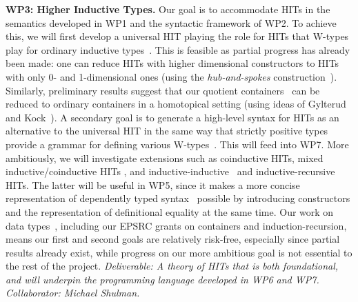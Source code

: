 \documentclass[a4paper,11pt]{article}
\begin{document}
{\bf WP3: Higher Inductive Types.} Our goal is to accommodate HITs in
the semantics developed in WP1 and the syntactic framework of WP2. To
achieve this, we will first develop a universal HIT playing the role for
HITs that W-types play for ordinary inductive
types~\cite{alti:icalp04}. This is feasible as partial progress has
already been made: one can reduce HITs with higher dimensional
constructors to HITs with only 0- and 1-dimensional ones (using the
\emph{hub-and-spokes} construction~\cite{hott-book}).
Similarly, preliminary results suggest that our quotient
containers~\cite{alti:mpc04} can be reduced
to ordinary containers in a homotopical setting 
(using ideas of Gylterud~\cite{gylterud:thesis} and
Kock~\cite{kock:groupoids}).
%
A secondary goal is to generate a high-level syntax for HITs as
an alternative to the universal HIT in the same way that strictly
positive types provide a grammar for defining various
W-types~\cite{alti:cont-tcs,alti:jcats07}.  This will feed into WP7.
More ambitiously, we will %
investigate extensions such as coinductive HITs, mixed
inductive/coinductive HITs \cite{txa:mpc2010g}, and
inductive-inductive~\cite{fnf:indind} and
inductive-recursive~\cite{DS:indrec} HITs. The latter will be useful
in WP5, since it makes a more concise representation of dependently
typed syntax~\cite{chapman2009type} possible by introducing
constructors and the representation of definitional equality at the
same time.
Our work on data
types~\cite{alti:cont-tcs,alti:lics09,alti:catind2,ghani:fibredIR,gambinoHyland:welfoundedTrees,awodeyGamSoja:indTypesInHTT},
including our EPSRC grants on containers and induction-recursion, means
our first and second goals
are relatively risk-free,
especially since partial results already exist, 
while progress on our more ambitious goal 
is not essential to the rest of the project. {\em Deliverable: A
  theory of HITs that is both foundational, and will underpin the
  programming language developed in WP6 and WP7. Collaborator: 
  Michael Shulman. }
\end{document}
